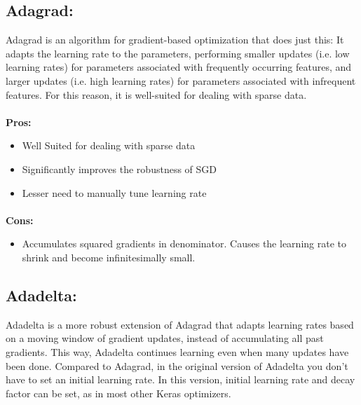 \documentclass{report}
\begin{document}
\subsection{Adagrad: }
Adagrad is an algorithm for gradient-based optimization that does just this: It adapts the learning rate to the parameters, performing smaller updates
(i.e. low learning rates) for parameters associated with frequently occurring features, and larger updates (i.e. high learning rates) for parameters associated with infrequent features. For this reason, it is well-suited for dealing with sparse data.
\paragraph{}
\textbf{Pros: }
\begin{itemize}
\item Well Suited for dealing with sparse data
\item Significantly improves the robustness of SGD
\item Lesser need to manually tune learning rate

\end{itemize}

\paragraph{}
\textbf{Cons: }
\begin{itemize}

\end{itemize}

\begin{itemize}
\item Accumulates squared gradients in denominator. Causes the learning rate to shrink and become infinitesimally small.  

\end{itemize}


\subsection{Adadelta: }
Adadelta is a more robust extension of Adagrad that adapts learning rates based on a moving window of gradient updates, instead of accumulating all past gradients. This way, Adadelta continues learning even when many updates have been done. Compared to Adagrad, in the original version of Adadelta you don't have to set an initial learning rate. In this version, initial learning rate and decay factor can be set, as in most other Keras optimizers.
\end{document}
